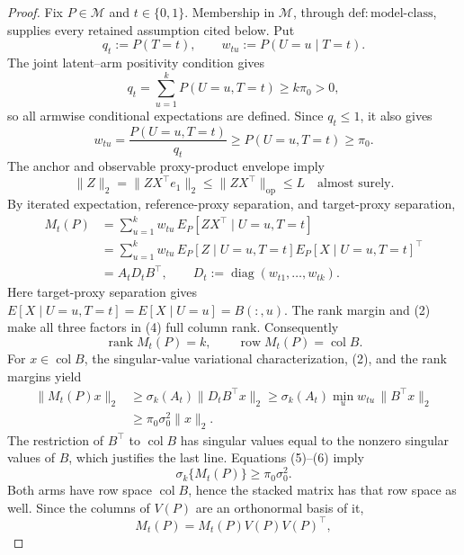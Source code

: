 \documentclass{article}
\begin{document}
\begin{proof}
Fix \(P\in\mathcal M\) and \(t\in\{0,1\}\).  Membership in \(\mathcal M\), through \(\mathrm{def:model\text{-}class}\), supplies every retained assumption cited below.  Put
\[
q_t:=P(T=t),\qquad w_{tu}:=P(U=u\mid T=t).
\]
The joint latent--arm positivity condition gives
\[
q_t=\sum_{u=1}^kP(U=u,T=t)\ge k\pi_0>0,                                      \tag{1}
\]
so all armwise conditional expectations are defined.  Since \(q_t\le1\), it also gives
\[
w_{tu}=\frac{P(U=u,T=t)}{q_t}\ge P(U=u,T=t)\ge\pi_0.                         \tag{2}
\]
The anchor and observable proxy-product envelope imply
\[
\lVert Z\rVert_2=\lVert ZX^\top e_1\rVert_2
\le\lVert ZX^\top\rVert_{\mathrm{op}}\le L\quad\text{almost surely}.          \tag{3}
\]
By iterated expectation, reference-proxy separation, and target-proxy separation,
\[
\begin{aligned}
M_t(P)
&=\sum_{u=1}^kw_{tu}\,E_P[ZX^\top\mid U=u,T=t]\\
&=\sum_{u=1}^kw_{tu}\,E_P[Z\mid U=u,T=t]E_P[X\mid U=u,T=t]^\top\\
&=A_tD_tB^\top,\qquad D_t:=\operatorname{diag}(w_{t1},\ldots,w_{tk}).
\end{aligned}                                                                  \tag{4}
\]
Here target-proxy separation gives \(E[X\mid U=u,T=t]=E[X\mid U=u]=B(:,u)\).  The rank margin and (2) make all three factors in (4) full column rank.  Consequently
\[
\operatorname{rank}M_t(P)=k,
\qquad \operatorname{row}M_t(P)=\operatorname{col}B.                           \tag{5}
\]
For \(x\in\operatorname{col}B\), the singular-value variational characterization, (2), and the rank margins yield
\[
\begin{aligned}
\lVert M_t(P)x\rVert_2
&\ge\sigma_k(A_t)\lVert D_tB^\top x\rVert_2
\ge\sigma_k(A_t)\min_u w_{tu}\,\lVert B^\top x\rVert_2\\
&\ge\pi_0\sigma_0^2\lVert x\rVert_2.                                         
\end{aligned}                                                                  \tag{6}
\]
The restriction of \(B^\top\) to \(\operatorname{col}B\) has singular values equal to the nonzero singular values of \(B\), which justifies the last line.  Equations (5)--(6) imply
\[
\sigma_k\{M_t(P)\}\ge\pi_0\sigma_0^2.                                      \tag{7}
\]
Both arms have row space \(\operatorname{col}B\), hence the stacked matrix has that row space as well.  Since the columns of \(V(P)\) are an orthonormal basis of it,
\[
M_t(P)=M_t(P)V(P)V(P)^\top,
\]
\end{proof}
\end{document}
